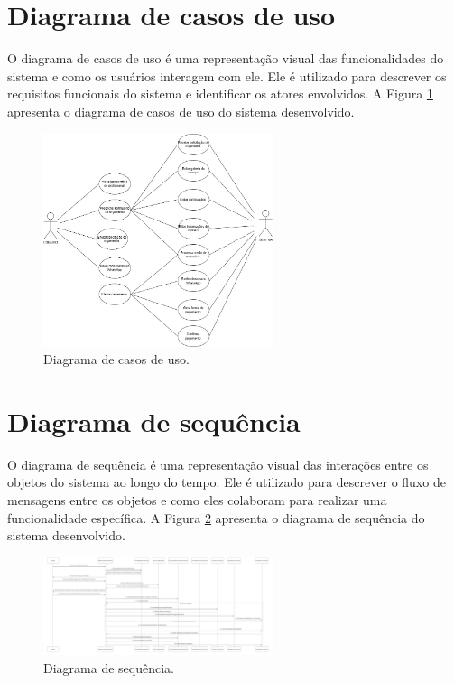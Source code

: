 \section{Diagrama de casos de uso}
\label{sec:casos}
O diagrama de casos de uso é uma representação visual das funcionalidades do sistema e como os usuários interagem com ele. Ele é utilizado para descrever os requisitos funcionais do sistema e identificar os atores envolvidos. A Figura \ref{fig:diagrama-uso} apresenta o diagrama de casos de uso do sistema desenvolvido.

\begin{figure}[H]
    \centering
    \includegraphics[width=0.6\textwidth]{Figures/Diagrama_de_uso.jpg} %
    \caption{Diagrama de casos de uso.}
    \label{fig:diagrama-uso}
\end{figure}


\section{Diagrama de sequência}
\label{sec:sequencia}   
O diagrama de sequência é uma representação visual das interações entre os objetos do sistema ao longo do tempo. Ele é utilizado para descrever o fluxo de mensagens entre os objetos e como eles colaboram para realizar uma funcionalidade específica. A Figura \ref{fig:diagrama-sequencia} apresenta o diagrama de sequência do sistema desenvolvido.

\begin{figure}[H]
    \centering
    \includegraphics[width=0.6\textwidth]{Figures/seq.jpg} %
    \caption{Diagrama de sequência.}
    \label{fig:diagrama-sequencia}
\end{figure}

